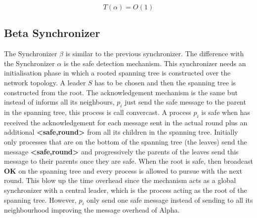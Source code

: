 \begin{equation}
\label{ec:time-alpha}
 T(\alpha) = O(1) 
\end{equation}


\subsection{Beta Synchronizer}

The Synchronizer $\beta$ is similar to the previous synchronizer. The difference with the Synchronizer $\alpha$ is the safe detection mechanism. This synchronizer needs an initialisation phase in which a rooted spanning tree is constructed over the network topology. A leader $S$ has to be chosen and then the spanning tree is constructed from the root. The acknowledgement mechanism is the same but instead of informs all its neighbours, $p_i$ just send the safe message to the parent in the spanning tree, this process is call convercast. A process $p_i$ is safe when has received the acknowledgement for each message sent in the actual round plus an additional \textbf{<safe,round>} from all its children in the spanning tree. Initially only processes that are on the bottom of the spanning tree (the leaves) send the message \textbf{<safe,round>} and progressively the parents of the leaves send this message to their parents once they are safe. When the root is safe, then broadcast \textbf{OK} on the spanning tree and every process is allowed to pursue with the next round. This blow up the time overhead since the mechanism acts as a global synchronizer with a central leader, which is the process acting as the root of the spanning tree. However, $p_i$ only send one safe message instead of sending to all its neighbourhood improving the message overhead of Alpha. 


